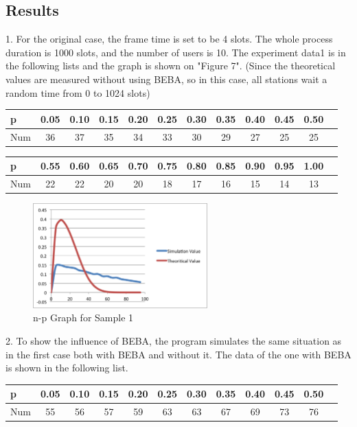 \documentclass[11pt,a4paper]{report}
\begin{document}
\subsection*{Results}
1. For the original case, the frame time is set to be 4 slots. The whole process duration is 1000 slots, and the number of users is 10. The experiment data1 is in the following lists and the graph is shown on "Figure 7". (Since the theoretical values are measured without using BEBA, so in this case, all stations wait a random time from 0 to 1024 slots) \\
\begin{table}[htbp]
\begin{tabular}{lccccccccccc}
\toprule
p & 0.05 & 0.10 & 0.15  & 0.20 & 0.25 & 0.30 & 0.35 & 0.40 & 0.45 & 0.50 \\
\midrule
Num & 36 & 37 & 35 & 34 & 33 & 30 & 29 & 27 & 25 & 25 \\
\bottomrule
\end{tabular}
\end{table}

\begin{table}[htbp]
\begin{tabular}{lccccccccccc}
\toprule
p & 0.55 & 0.60 & 0.65  & 0.70 & 0.75 & 0.80 & 0.85 & 0.90 & 0.95 & 1.00 \\
\midrule
Num & 22 & 22 & 20 & 20 & 18 & 17 & 16 & 15 & 14 & 13 \\
\bottomrule
\end{tabular}
\end{table}

\begin{figure}
\centering
\includegraphics[width=0.6\textwidth]{4_2.eps}
\caption{n-p Graph for Sample 1}
\end{figure}

2. To show the influence of BEBA, the program simulates the same situation as in the first case both with BEBA and without it. The data of the one with BEBA is shown in the following list. \\
\begin{table}[htbp]
\begin{tabular}{lccccccccccc}
\toprule
p & 0.05 & 0.10 & 0.15  & 0.20 & 0.25 & 0.30 & 0.35 & 0.40 & 0.45 & 0.50 \\
\midrule
Num & 55 & 56 & 57 & 59 & 63 & 63 & 67 & 69 & 73 & 76 \\
\bottomrule
\end{tabular}
\end{table}
\end{document}
